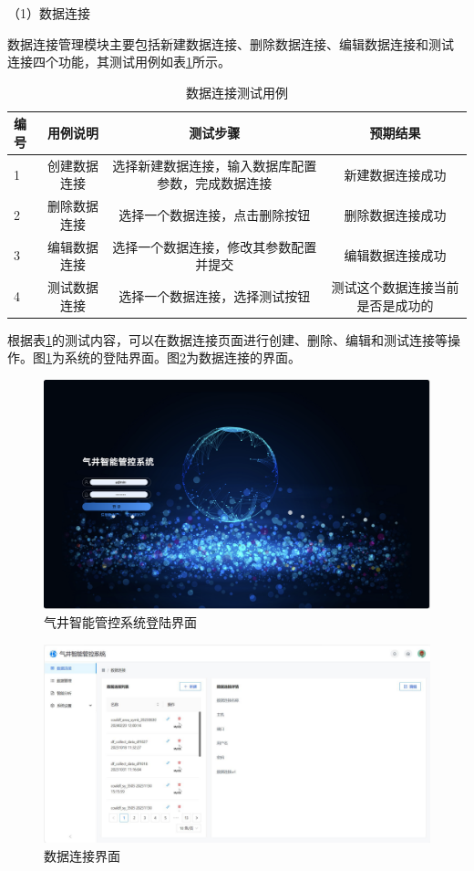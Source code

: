 （1）数据连接

数据连接管理模块主要包括新建数据连接、删除数据连接、编辑数据连接和测试
连接四个功能，其测试用例如表\ref{tab:testcon}所示。
\begin{table}
    \renewcommand{\arraystretch}{1.5}
    \centering
    \caption{数据连接测试用例}
    \label{tab:testcon}
    \begin{tabular}{|l|c|c|c|}
        \hline
        编号 & 用例说明 &  测试步骤 & 预期结果 \\
        \hline
        1 & 创建数据连接 &  选择新建数据连接，输入数据库配置参数，完成数据连接 & 新建数据连接成功 \\
        \hline
        2 & 删除数据连接 & 选择一个数据连接，点击删除按钮 & 删除数据连接成功\\
        \hline
        3 & 编辑数据连接 & 选择一个数据连接，修改其参数配置并提交 & 编辑数据连接成功 \\
        \hline
        4 & 测试数据连接 & 选择一个数据连接，选择测试按钮 & 测试这个数据连接当前是否是成功的 \\
        \hline
    \end{tabular}
\end{table}

根据表\ref{tab:testcon}的测试内容，可以在数据连接页面进行创建、删除、编辑和测试连接等操作。图\ref{fig:login}为系统的登陆界面。图\ref{fig:dataconre}为数据连接的界面。

\begin{figure}
    \centering
    \includegraphics{figure/login.pdf}
    \caption{气井智能管控系统登陆界面}
    \label{fig:login}
\end{figure}
\begin{figure}
    \centering
    \includegraphics{figure/数据连接.pdf}
    \caption{数据连接界面}
    \label{fig:dataconre}
\end{figure}

